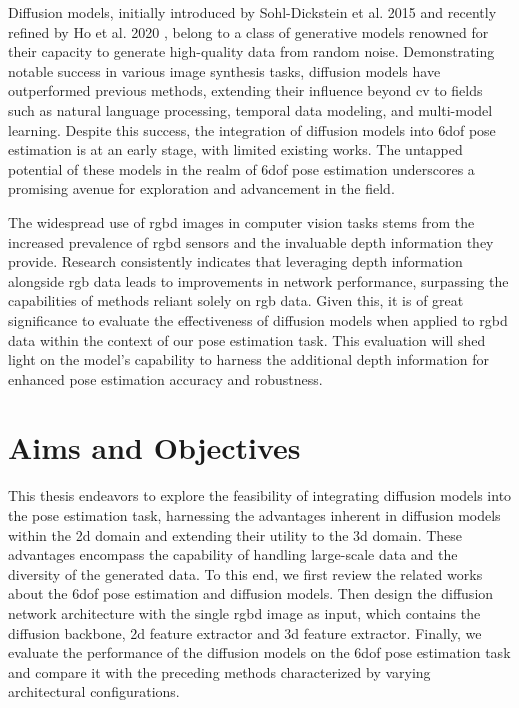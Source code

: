 \documentclass[12pt,DIV14,BCOR12mm,a4paper,footinclude=false,headinclude,parskip=half-,twoside,openright,cleardoublepage=empty,toc=index,bibliography=totoc,listof=totoc]{scrreprt}
\numberwithin{equation}{chapter}
\begin{document}
Diffusion models, initially introduced by Sohl-Dickstein et al. 2015 \cite{sohldickstein2015deep} and recently refined by Ho et al. 2020 \cite{ho2020denoising}, belong to a class of generative models renowned for their capacity to generate high-quality data from random noise. Demonstrating notable success in various image synthesis tasks, diffusion models have outperformed previous methods, extending their influence beyond \gls{cv} to fields such as natural language processing, temporal data modeling, and multi-model learning. Despite this success, the integration of diffusion models into \gls{6dof} pose estimation is at an early stage, with limited existing works. The untapped potential of these models in the realm of \gls{6dof} pose estimation underscores a promising avenue for exploration and advancement in the field.

The widespread use of \gls{rgbd} images in computer vision tasks stems from the increased prevalence of \gls{rgbd} sensors and the invaluable depth information they provide. Research consistently indicates that leveraging depth information alongside \gls{rgb} data leads to improvements in network performance, surpassing the capabilities of methods reliant solely on \gls{rgb} data. Given this, it is of great significance to evaluate the effectiveness of diffusion models when applied to \gls{rgbd} data within the context of our pose estimation task. This evaluation will shed light on the model's capability to harness the additional depth information for enhanced pose estimation accuracy and robustness.
\section{Aims and Objectives}
This thesis endeavors to explore the feasibility of integrating diffusion models into the pose estimation task, harnessing the advantages inherent in diffusion models within the \gls{2d} domain and extending their utility to the \gls{3d} domain. These advantages encompass the capability of handling large-scale data and the diversity of the generated data. To this end, we first review the related works about the \gls{6dof} pose estimation and diffusion models. Then design the diffusion network architecture with the single \gls{rgbd} image as input, which contains the diffusion backbone, \gls{2d} feature extractor and \gls{3d} feature extractor. Finally, we evaluate the performance of the diffusion models on the \gls{6dof} pose estimation task and compare it with the preceding methods characterized by varying architectural configurations.
\end{document}
